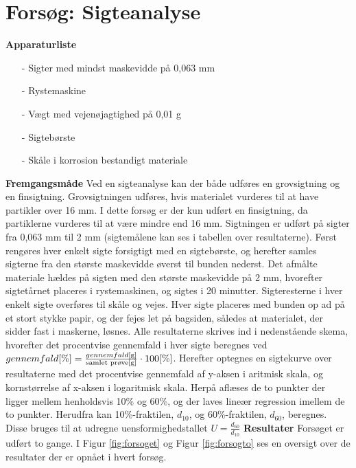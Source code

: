 \chapter{Forsøg: Sigteanalyse}

\textbf{Apparaturliste}
\begin{itemize}
	\item[-] Sigter med mindst maskevidde på 0,063 mm
	\item[-] Rystemaskine
	\item[-] Vægt med vejenøjagtighed på 0,01 g
	\item[-] Sigtebørste
	\item[-] Skåle i korrosion bestandigt materiale
\end{itemize}
\textbf{Fremgangsmåde}
\newline
Ved en sigteanalyse kan der både udføres en grovsigtning og en finsigtning. Grovsigtningen udføres, hvis materialet vurderes til at have partikler over 16 mm. I dette forsøg er der kun udført en finsigtning, da partiklerne vurderes til at være mindre end 16 mm. Sigtningen er udført på sigter fra 0,063 mm til 2 mm (sigtemålene kan ses i tabellen over resultaterne). 
\newline \indent{     }   Først rengøres hver enkelt sigte forsigtigt med en sigtebørste, og herefter samles sigterne fra den største maskevidde øverst til bunden nederst. Det afmålte materiale hældes på sigten med den største maskevidde på 2 mm, hvorefter sigtetårnet placeres i rystemaskinen, og sigtes i 20 minutter.
\newline \indent{     }   Sigteresterne i hver enkelt sigte overføres til skåle og vejes. Hver sigte placeres med bunden op ad på et stort stykke papir, og der fejes let på bagsiden, således at materialet, der sidder fast i maskerne, løsnes.
\newline \indent{     }   Alle resultaterne skrives ind i nedenstående skema, hvorefter det procentvise gennemfald i hver sigte beregnes ved $gennemfald [\%] = \frac{gennemfald [\text{g}]}{\textup{samlet prøve} [\text{g}]}\cdot 100 [\%]$. Herefter optegnes en sigtekurve over resultaterne med det procentvise gennemfald af y-aksen i aritmisk skala, og kornstørrelse af x-aksen i logaritmisk skala. Herpå aflæses de to punkter der ligger mellem henholdsvis 10\% og 60\%, og der laves lineær regression imellem de to punkter. Herudfra kan 10\%-fraktilen, $d_{10}$, og 60\%-fraktilen, $d_{60}$, beregnes. Disse bruges til at udregne uensformighedstallet $U = \frac{d_{60}}{d_{10}}$
\newline
\newline
\textbf{Resultater}
\newline
Forsøget er udført to gange. I Figur \ref{fig:forsoget} og Figur \ref{fig:forsogto} ses en oversigt over de resultater der er opnået i hvert forsøg. 

